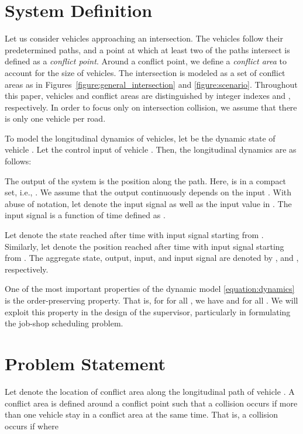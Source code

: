\documentclass{sig-alternate}
\begin{document}
\section{System Definition}\label{section:system_definition}

Let us consider  vehicles approaching an intersection. The vehicles follow their predetermined paths, and a point at which at least two of the paths intersect is defined as a \textit{conflict point}. Around a conflict point, we define a \textit{conflict area} to account for the size of vehicles. The intersection is modeled as a set of  conflict areas as in Figures~\ref{figure:general_intersection} and \ref{figure:scenario}. Throughout this paper, vehicles and conflict areas are distinguished by integer indexes  and , respectively. In order to focus only on intersection collision, we assume that there is only one vehicle per road. 

To model the longitudinal dynamics of vehicles, let  be the dynamic state of vehicle . Let  the control input of vehicle . Then, the longitudinal dynamics are as follows:

The output of the system is the position  along the path. Here,  is in a compact set, i.e., . We assume that the output  continuously depends on the input . With abuse of notation, let  denote the input signal as well as the input value in . The input signal  is a function of time defined as .  

Let  denote the state reached after time  with input signal  starting from . Similarly, let  denote the position reached after time  with input signal  starting from . The aggregate state, output, input, and input signal are denoted by , and , respectively.

One of the most important properties of the dynamic model \eqref{equation:dynamics} is the order-preserving property. That is, for  for all , we have  and  for all . We will exploit this property in the design of the supervisor, particularly in formulating the job-shop scheduling problem.
	
\section{Problem Statement}\label{section:problem_statement}

Let  denote the location of conflict area  along the longitudinal path of vehicle . A conflict area is defined around a conflict point such that a collision occurs if more than one vehicle stay in a conflict area at the same time. That is, a collision occurs if  where
\end{document}
